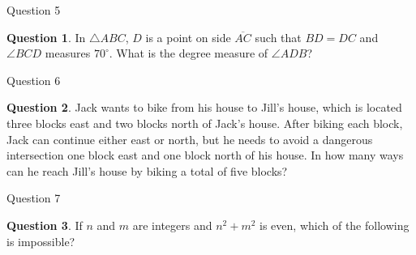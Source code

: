 \documentclass[handout]{beamer}
\theoremstyle{definition}
\newtheorem{quest}{Question}
\begin{document}
\begin{frame}{Question 5}
\begin{quest}
In $\bigtriangleup ABC$, $D$ is a point on side $\overline{AC}$ such that $BD=DC$ and $\angle BCD$ measures $70^\circ$. What is the degree measure of $\angle ADB$?
\end{quest}
\begin{center}
\small
{}
\end{center}
\end{frame}

\begin{frame}{Question 6}
\begin{quest}
Jack wants to bike from his house to Jill's house, which is located three blocks east and two blocks north of Jack's house. After biking each block, Jack can continue either east or north, but he needs to avoid a dangerous intersection one block east and one block north of his house. In how many ways can he reach Jill's house by biking a total of five blocks?
\end{quest}
\end{frame}

\begin{frame}{Question 7}
\begin{quest}
If $n$ and $m$ are integers and $n^2+m^2$ is even, which of the following is impossible?
\end{quest}
\end{frame}
\end{document}
